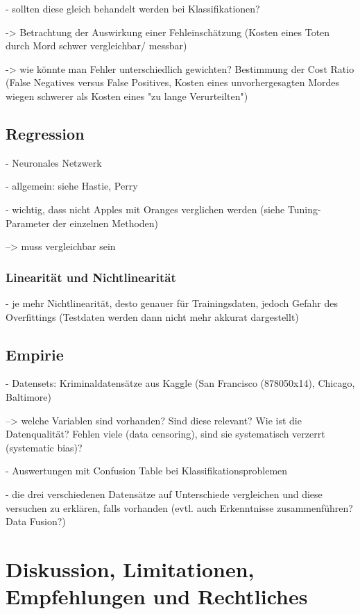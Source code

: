 \documentclass[a4paper,12pt,parskip,bibtotoc,liststotoc]{article}
\begin{document}
- sollten diese gleich behandelt werden bei Klassifikationen?

-> Betrachtung der Auswirkung einer Fehleinschätzung (Kosten eines Toten durch Mord schwer vergleichbar/ messbar)

-> wie könnte man Fehler unterschiedlich gewichten? Bestimmung der Cost Ratio (False Negatives versus False Positives, Kosten eines unvorhergesagten Mordes wiegen schwerer als Kosten eines "zu lange Verurteilten")



\subsection{Regression}

- Neuronales Netzwerk

- allgemein: siehe Hastie, Perry


- wichtig, dass nicht Apples mit Oranges verglichen werden (siehe Tuning-Parameter der einzelnen Methoden)

--> muss vergleichbar sein


\subsubsection{Linearität und Nichtlinearität}

- je mehr Nichtlinearität, desto genauer für Trainingsdaten, jedoch Gefahr des Overfittings (Testdaten werden dann nicht mehr akkurat dargestellt)


\newpage
\subsection{Empirie}

- Datensets: Kriminaldatensätze aus Kaggle (San Francisco (878050x14), Chicago, Baltimore)

--> welche Variablen sind vorhanden? Sind diese relevant? Wie ist die Datenqualität? Fehlen viele (data censoring), sind sie systematisch verzerrt (systematic bias)?

- Auswertungen mit Confusion Table bei Klassifikationsproblemen

- die drei verschiedenen Datensätze auf Unterschiede vergleichen und diese versuchen zu erklären, falls vorhanden (evtl. auch Erkenntnisse zusammenführen? Data Fusion?)


\newpage
\section{Diskussion, Limitationen, Empfehlungen und Rechtliches}
\end{document}
